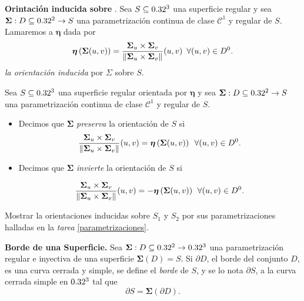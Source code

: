 \begin{definition}\textbf{Orintaci\'on inducida sobre}\label{sigma_induce_1} {}. Sea $S\subseteq0.32^3$ una superficie regular y sea $\boldsymbol{\Sigma}:D\subseteq0.32^2\to S$ una parametrizaci\'on continua de clase $\mathcal{C}^1$ y regular de $S$. Lamaremos a  $\boldsymbol{\eta}$ dada por  
\[
            \boldsymbol{\eta}\left(\boldsymbol{\Sigma}(u,v)\right) = \frac{\boldsymbol{\Sigma}_u\times\boldsymbol{\Sigma}_v}{\norm{\boldsymbol{\Sigma}_u\times\boldsymbol{\Sigma}_v}}(u,v) \:\; \forall (u,v) \in D^{0}.
        \]  \emph{ la orientaci\'on inducida} por   $\Sigma$  sobre $S$.  
\end{definition}

\begin{definition}\label{def:preseva} 
    Sea $S\subseteq0.32^3$ una superficie regular  orientada por $\boldsymbol{\eta}$ y sea $\boldsymbol{\Sigma}:D\subseteq0.32^2\to S$ una parametrizaci\'on continua de clase $\mathcal{C}^1$ y regular de $S$.
    \begin{itemize}
        \item  Decimos que $\boldsymbol{\Sigma}$ \emph{preserva} la orientaci\'on de $S$ si  
        \[
            \frac{\boldsymbol{\Sigma}_u\times\boldsymbol{\Sigma}_v}{\norm{\boldsymbol{\Sigma}_u\times\boldsymbol{\Sigma}_v}}(u,v)=\boldsymbol{\eta}\left(\boldsymbol{\Sigma}(u,v)\right)  \:\; \forall (u,v) \in D^{0}.
        \]  
       
        \item  Decimos que $\boldsymbol{\Sigma}$ \emph{invierte} la orientaci\'on de $S$ si 

 \[
            \frac{\boldsymbol{\Sigma}_u\times\boldsymbol{\Sigma}_v}{\norm{\boldsymbol{\Sigma}_u\times\boldsymbol{\Sigma}_v}}(u,v)=-\boldsymbol{\eta}\left(\boldsymbol{\Sigma}(u,v)\right) \:\: \forall (u,v) \in D^{0}.
        \]
 \end{itemize}
\end{definition}

\begin{tarea} Mostrar la orientaciones inducidas sobre $S_1$ y $S_2$  por sus parametrizaciones  halladas en la \emph{tarea} \ref{parametrizaciones}.
\end{tarea}


\begin{definition} \textbf{Borde de una Superficie.} 
   Sea $\boldsymbol{\Sigma}:D\subseteq0.32^2 \to0.32^3$ una parametrizaci\'on regular  e  inyectiva de una superficie $\boldsymbol{\Sigma}(D) = S$.  Si $ \partial D$,  el borde del conjunto $D$,  es una curva cerrada y simple, se define el \emph{borde}  de $S$, y se lo nota $\partial S$,  a la curva cerrada simple en $0.32^3$ tal que 
    \[
        \partial S=\boldsymbol{\Sigma}(\partial D).
    \]
\end{definition}


